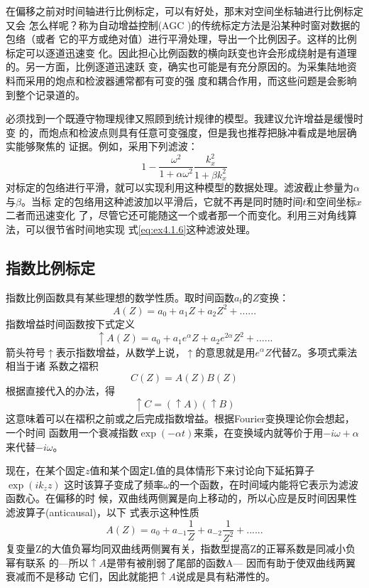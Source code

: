 在偏移之前对时间轴进行比例标定，可以有好处，那末对空间坐标轴进行比例标定又会
怎么样呢？称为自动增益控制(AGC
)的传统标定方法是沿某种时窗对数据的包络（或者
它的平方或绝对值）进行平滑处理，导出一个比例因子。这样的比例标定可以逐道迅速变
化。因此担心比例函数的横向跃变也许会形成绕射是有道理的。另一方面，比例逐道迅速跃
变，确实也可能是有充分原因的。为采集陆地资料而采用的炮点和检波器逋常都有可变的强
度和耦合作用，而这些问题是会影晌到整个记录道的。

必须找到一个既遵守物理规律又照顾到统计规律的模型。我建议允许增益是缓慢时变
的，而炮点和检波点则具有任意可变强度，但是我也推荐把脉冲看成是地层确实能够聚焦的
证据。例如，采用下列滤波：
\begin{equation}
1-\frac{\omega^2}{1+\alpha\omega^2}\frac{k_x^2}{1+\beta k_x^2}
\label{eq:ex4.1.6}
\end{equation}
对标定的包络进行平滑，就可以实现利用这种模型的数据处理。滤波截止参量为$\alpha$与$\beta$。当标
定的包络用这种滤波加以平滑后，它就不再是同时随时间$t$和空间坐标$x$二者而迅速变化
了，尽管它还可能随这一个或者那一个而变化。利用三对角线算法，可以很节省时间地实现
式\ref{eq:ex4.1.6}这种滤波处理。

\subsection{指数比例标定}
\label{sec:4.1.14}

指数比例函数具有某些理想的数学性质。取时间函数$a_t$的$Z$变换：
\begin{equation}
A(Z)=a_0+a_1Z+a_2Z^2+......
\label{eq:ex4.1.7}
\end{equation}
指数增益时间函数按下式定义
\begin{equation}
\uparrow A(Z)=a_0+a_1e^\alpha Z+a_2e^{2\alpha} Z^2+......
\label{eq:ex4.1.8}
\end{equation}
箭头符号$\uparrow$表示指数增益，从数学上说，$\uparrow$的意思就是用$e^\alpha Z$代替Z。多项式乘法相当于诸
系数之褶积
\begin{equation}
C(Z)=A(Z)B(Z)
\label{eq:ex4.1.9}
\end{equation}
根据直接代入的办法，得
\begin{equation}
\uparrow C=(\uparrow A)(\uparrow B)
\label{eq:ex4.1.10}
\end{equation}
这意味着可以在褶积之前或之后完成指数增益。根据Fourier变换理论你会想起，一个时间
函数用一个衰减指数$\exp(-\alpha t)$来乘，在变换域内就等价于用$-i\omega+\alpha$
来代替$-i\omega$。

现在，在某个固定$z$值和某个固定L值的具体情形下来讨论向下延拓算子$\exp(ik_zz)$
这时该算子变成了频率$\omega$的一个函数，在时间域内能将它表示为滤波函数心。在偏移的时
候，双曲线两侧翼是向上移动的，所以心应是反时间因果性滤波算子(anticausal)，以下
式表示这种性质
\begin{equation}
A(Z)=a_0+a_{-1}\frac{1}{Z}+a_{-2}\frac{1}{Z^2}+......
\label{eq:ex4.1.11}
\end{equation}
复变量Z的大值负幂均同双曲线两侧翼有关，指数型提高Z的正幂系数是同减小负幂有联系
的---所以$\uparrow A$是带有被削弱了尾部的函数A---
因而有助于使双曲线两翼衰减而不是移动
它们，因此就能把$\uparrow A$说成是具有粘滞性的。

